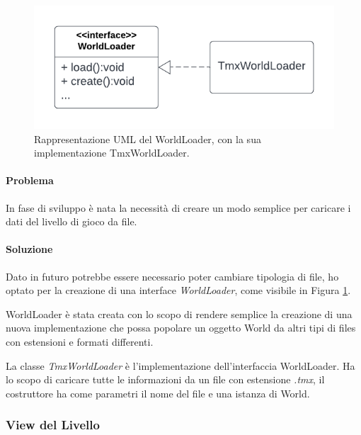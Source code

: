 \documentclass[a4paper,12pt]{report}
\begin{document}
    \begin{figure}[H]
        \centering{}
        \includegraphics[scale=1] {img/worldloader.png}
        \caption{Rappresentazione UML del WorldLoader, con la sua implementazione TmxWorldLoader.}
        \label{img:worldloader}
    \end{figure}

    \paragraph{Problema} In fase di sviluppo è nata la necessità di creare un modo semplice per caricare i dati del livello di gioco da file.

    \paragraph{Soluzione} Dato in futuro potrebbe essere necessario poter cambiare tipologia di file, ho optato per la creazione di una interface \emph{WorldLoader}, come visibile in Figura \ref{img:worldloader}.

    WorldLoader è stata creata con lo scopo di rendere semplice la creazione di una nuova implementazione che possa popolare un oggetto World da altri tipi di files con estensioni e formati differenti.

    La classe \emph{TmxWorldLoader} è l'implementazione dell'interfaccia WorldLoader. Ha lo scopo di caricare tutte le informazioni da un file con estensione \emph{.tmx}, il costruttore ha come parametri il nome del file e una istanza di World.

    \subsubsection{View del Livello}
\end{document}
